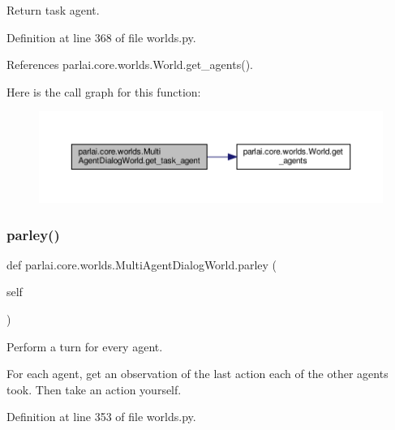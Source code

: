 \begin{DoxyVerb}Return task agent.\end{DoxyVerb}
 

Definition at line 368 of file worlds.\+py.



References parlai.\+core.\+worlds.\+World.\+get\+\_\+agents().

Here is the call graph for this function\+:
\nopagebreak
\begin{figure}[H]
\begin{center}
\leavevmode
\includegraphics[width=350pt]{classparlai_1_1core_1_1worlds_1_1MultiAgentDialogWorld_a58ea065f63c441f27c97b6cb649ccf53_cgraph}
\end{center}
\end{figure}
\mbox{\label{classparlai_1_1core_1_1worlds_1_1MultiAgentDialogWorld_a2b41d3026bc5afa04e7f874ba097b721}} 
\subsubsection{\texorpdfstring{parley()}{parley()}}
{\footnotesize\ttfamily def parlai.\+core.\+worlds.\+Multi\+Agent\+Dialog\+World.\+parley (\begin{DoxyParamCaption}\item[{}]{self }\end{DoxyParamCaption})}

\begin{DoxyVerb}Perform a turn for every agent.

For each agent, get an observation of the last action each of the
other agents took. Then take an action yourself.
\end{DoxyVerb}
 

Definition at line 353 of file worlds.\+py.



